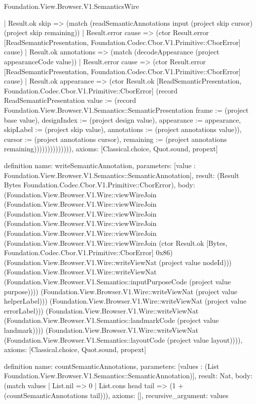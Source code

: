 \begin{lexlean}{Foundation.View.Browser.V1.SemanticsWire}
\begin{semanticmodule}
{                    | Result.ok skip => (match (readSemanticAnnotations input (project skip cursor) (project skip remaining))
                      | Result.error cause => (ctor Result.error [ReadSemanticPresentation, Foundation.Codec.Cbor.V1.Primitive::CborError] cause)
                      | Result.ok annotations => (match (decodeAppearance (project appearanceCode value))
                        | Result.error cause => (ctor Result.error [ReadSemanticPresentation, Foundation.Codec.Cbor.V1.Primitive::CborError] cause)
                        | Result.ok appearance => (ctor Result.ok [ReadSemanticPresentation, Foundation.Codec.Cbor.V1.Primitive::CborError] (record ReadSemanticPresentation {value := (record Foundation.View.Browser.V1.Semantics::SemanticPresentation {frame := (project base value), designIndex := (project design value), appearance := appearance, skipLabel := (project skip value), annotations := (project annotations value)}), cursor := (project annotations cursor), remaining := (project annotations remaining)}))))))))))))),
  axioms: [Classical.choice, Quot.sound, propext]
}

definition{
  name: writeSemanticAnnotation,
  parameters: [value : Foundation.View.Browser.V1.Semantics::SemanticAnnotation],
  result: (Result Bytes Foundation.Codec.Cbor.V1.Primitive::CborError),
  body: (Foundation.View.Browser.V1.Wire::viewWireJoin (Foundation.View.Browser.V1.Wire::viewWireJoin (Foundation.View.Browser.V1.Wire::viewWireJoin (Foundation.View.Browser.V1.Wire::viewWireJoin (Foundation.View.Browser.V1.Wire::viewWireJoin (Foundation.View.Browser.V1.Wire::viewWireJoin (ctor Result.ok [Bytes, Foundation.Codec.Cbor.V1.Primitive::CborError] 0x86) (Foundation.View.Browser.V1.Wire::writeViewNat (project value nodeId))) (Foundation.View.Browser.V1.Wire::writeViewNat (Foundation.View.Browser.V1.Semantics::inputPurposeCode (project value purpose)))) (Foundation.View.Browser.V1.Wire::writeViewNat (project value helperLabel))) (Foundation.View.Browser.V1.Wire::writeViewNat (project value errorLabel))) (Foundation.View.Browser.V1.Wire::writeViewNat (Foundation.View.Browser.V1.Semantics::landmarkCode (project value landmark)))) (Foundation.View.Browser.V1.Wire::writeViewNat (Foundation.View.Browser.V1.Semantics::layoutCode (project value layout)))),
  axioms: [Classical.choice, Quot.sound, propext]
}

definition{
  name: countSemanticAnnotations,
  parameters: [values : (List Foundation.View.Browser.V1.Semantics::SemanticAnnotation)],
  result: Nat,
  body: (match values
    | List.nil => 0
    | List.cons head tail => (1 + (countSemanticAnnotations tail))),
  axioms: [],
  recursive_argument: values
}


\end{semanticmodule}
\end{lexlean}
